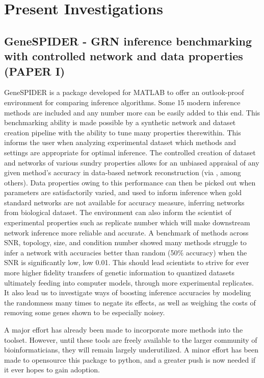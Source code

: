 
\chapter{Present Investigations}

\section{GeneSPIDER - GRN inference benchmarking with controlled network and data properties (PAPER I)}
GeneSPIDER is a package developed for MATLAB to offer an outlook-proof environment for comparing inference algorithms. Some 15 modern inference methods are included and any number more can be easily added to this end. This benchmarking ability is made possible by a synthetic network and dataset creation pipeline with the ability to tune many properties therewithin. This informs the user when analyzing experimental dataset which methods and settings are appropriate for optimal inference. 
The controlled creation of dataset and networks of various sundry properties allows for an unbiased appraisal of any given method's accuracy in data-based network reconstruction (via , among others). Data properties owing to this performance can then be picked out when parameters are satisfactorily varied, and used to inform inference when gold standard networks are not available for accuracy measure, \ie inferring networks from biological dataset. The environment can also inform the scientist of experimental properties such as replicate number which will make downstream network inference more reliable and accurate.
A benchmark of methods across SNR, topology, size, and condition number showed many methods struggle to infer a network with accuracies better than random (50\% accuracy) when the SNR is significantly low, \ie low 0.01. This should lead scientists to strive for ever more higher fidelity transfers of genetic information to quantized datasets ultimately feeding into computer models, \ie through more experimental replicates. It also lead us to investigate ways of boosting inference accuracies by modeling the randomness many times to negate its effects, as well as weighing the costs of removing some genes shown to be especially noisey.


A major effort has already been made to incorporate more methods into the toolset. However, until these tools are freely available to the larger community of bioinformaticians, they will remain largely underutilized. A minor effort has been made to opensource this package to python, and a greater push is now needed if it ever hopes to gain adoption.


